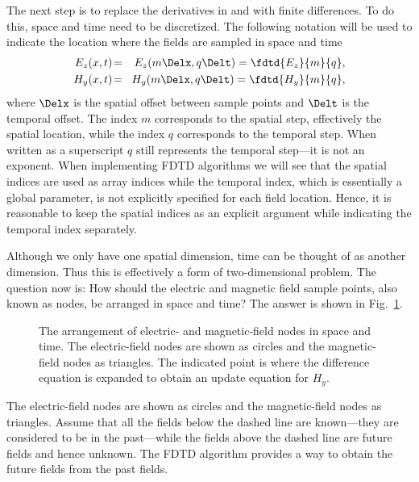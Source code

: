 The next step is to replace the derivatives in
 and  with finite
differences.  To do this, space and time need to be discretized.  The
following notation will be used to indicate the location where the
fields are sampled in space and time
\begin{eqnarray}
  E_z(x,t) \!&=&\! E_z(m\Delx, q\Delt) = \fdtd{E_z}{m}{q}, \\
  H_y(x,t) \!&=&\! H_y(m\Delx, q\Delt) = \fdtd{H_y}{m}{q},
\end{eqnarray}
where $\Delx$ is the spatial offset between sample points and $\Delt$
is the temporal offset.  The index $m$ corresponds to the spatial
step, effectively the spatial location, while the index $q$
corresponds to the temporal step.  When written as a superscript $q$
still represents the temporal step---it is not an exponent.  When
implementing FDTD algorithms we will see that the spatial indices are
used as array indices while the temporal index, which is essentially a
global parameter, is not explicitly specified for each field location.
Hence, it is reasonable to keep the spatial indices as an explicit
argument while indicating the temporal index separately.

Although we only have one spatial dimension, time can be thought of as
another dimension.  Thus this is effectively a form of two-dimensional
problem.  The question now is: How should the electric and magnetic
field sample points, also known as nodes, be arranged in space and
time?  The answer is shown in Fig.\ \ref{fig:spaceTime}.
\begin{figure}
  \begin{center}
  \end{center}
  \caption{The arrangement of electric- and magnetic-field nodes in
  space and time.  The electric-field nodes are shown as circles and
  the magnetic-field nodes as triangles.  The indicated point is where the
  difference equation is expanded to obtain an update equation for
  $H_y$.}
  \label{fig:spaceTime}
\end{figure}
The electric-field nodes are shown as circles and the magnetic-field
nodes as triangles.  Assume that all the fields below the dashed line
are known---they are considered to be in the past---while the fields
above the dashed line are future fields and hence unknown.  The FDTD
algorithm provides a way to obtain the future fields from the past
fields.

